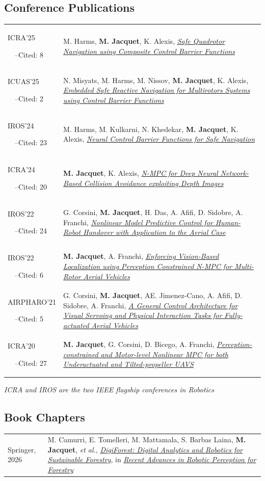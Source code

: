 \documentclass[11pt,a4paper]{article}
\newlength{\colone}
\newlength{\coltwo}
\newcommand{\cited}[1]{\par\footnotesize{~~--Cited: #1}}
\newcommand{\notes}[1]{{\small\color{gray}\itshape #1}}
\newcommand{\me}{{\bfseries M. Jacquet}}
\begin{document}
\subsection{Conference Publications}
\begin{longtable}{@{}p{\colone}p{\coltwo}@{}}
	ICRA'25	\cited{8}
	& M. Harms, \me, K. Alexis, \href{https://doi.org/10.1109/ICRA55743.2025.11127368}{\itshape Safe Quadrotor Navigation using Composite Control Barrier Functions}
\\
	ICUAS'25 \cited{2}
	& N. Misyats, M. Harms, M. Nissov, \me, K. Alexis, \href{https://doi.org/10.1109/ICUAS65942.2025.11007827}{\itshape Embedded Safe Reactive Navigation for Multirotors Systems using Control Barrier Functions}
\\
	IROS'24	\cited{23}
	& M. Harms, M. Kulkarni, N. Khedekar, \me, K. Alexis, \href{https://doi.org/10.1109/IROS58592.2024.10802694}{\itshape Neural Control Barrier Functions for Safe Navigation} 
\\
	ICRA'24	\cited{20}
	& \me, K. Alexis, \href{https://doi.org/10.1109/ICRA57147.2024.10610572}{\itshape N-MPC for Deep Neural Network-Based Collision Avoidance exploiting Depth Images}
\\
	IROS'22	\cited{24}
	& G. Corsini, \me, H. Das, A. Afifi, D. Sidobre, A. Franchi, \href{https://doi.org/10.1109/IROS47612.2022.9981045}{\itshape Nonlinear Model Predictive Control for Human-Robot Handover with Application to the Aerial Case}
\\
	IROS'22	\cited{6}
	& \me, A. Franchi, \href{https://doi.org/10.1109/IROS47612.2022.9981643}{\itshape Enforcing Vision-Based Localization using Perception Constrained N-MPC for Multi-Rotor Aerial Vehicles}
\\
	AIRPHARO'21	\cited{5} & G. Corsini, \me, AE. Jimenez-Cano, A. Afifi, D. Sidobre, A. Franchi, \href{https://doi.org/10.1109/AIRPHARO52252.2021.9571053}{\itshape A General Control Architecture for Visual Servoing and Physical Interaction Tasks for Fully-actuated Aerial Vehicles}
\\
	ICRA'20	\cited{27}
	& \me, G. Corsini, D. Bicego, A. Franchi, \href{https://doi.org/10.1109/ICRA40945.2020.9197281}{\itshape Perception-constrained and Motor-level Nonlinear MPC for both Underactuated and Tilted-propeller UAVS}
\end{longtable}
\notes{ICRA and IROS are the two IEEE flagship conferences in Robotics}
%
\subsection{Book Chapters}
\begin{longtable}{@{}p{\colone}p{\coltwo}@{}}
	Springer, 2026 %
	& M. Camurri, E. Tomelleri, M. Mattamala, S. Barbas Laina, \me,
	\textit{et al.},
	\href{https://TODO}{\itshape DigiForest: Digital Analytics and Robotics for Sustainable Forestry}, in \href{https://link.springer.com/book/9783032158116}{\itshape Recent Advances in Robotic Perception for Forestry}
\end{longtable}
\end{document}
